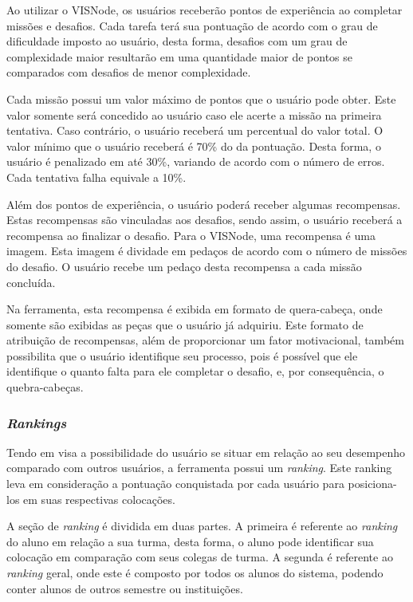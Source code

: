 \documentclass[
	12pt,				%
	oneside,			%
	a4paper,			%
	english,			%
	french,				%
	spanish,			%
	brazil,				%
	]{abntex2}
\begin{document}
Ao utilizar o VISNode, os usuários receberão pontos de experiência ao completar missões e desafios. Cada tarefa terá sua pontuação de acordo com o grau de dificuldade imposto ao usuário, desta forma, desafios com um grau de complexidade maior resultarão em uma quantidade maior de pontos se comparados com desafios de menor complexidade.

Cada missão possui um valor máximo de pontos que o usuário pode obter. Este valor somente será concedido ao usuário caso ele acerte a missão na primeira tentativa. Caso contrário, o usuário receberá um percentual do valor total. O valor mínimo que o usuário receberá é 70\% do da pontuação. Desta forma, o usuário é penalizado em até 30\%, variando de acordo com o número de erros. Cada tentativa falha equivale a 10\%.

Além dos pontos de experiência, o usuário poderá receber algumas recompensas. Estas recompensas são vinculadas aos desafios, sendo assim, o usuário receberá a recompensa ao finalizar o desafio. Para o VISNode, uma recompensa é uma imagem. Esta imagem é dividade em pedaços de acordo com o número de missões do desafio. O usuário recebe um pedaço desta recompensa a cada missão concluída.

Na ferramenta, esta recompensa é exibida em formato de quera-cabeça, onde somente são exibidas as peças que o usuário já adquiriu. Este formato de atribuição de recompensas, além de proporcionar um fator motivacional, também possibilita que o usuário identifique seu processo, pois é possível que ele identifique o quanto falta para ele completar o desafio, e, por consequência, o quebra-cabeças. 

\subsubsection{\textit{Rankings}}

Tendo em visa a possibilidade do usuário se situar em relação ao seu desempenho comparado com outros usuários, a ferramenta possui um \textit{ranking}. Este ranking leva em consideração a pontuação conquistada por cada usuário para posiciona-los em suas respectivas colocações.

A seção de \textit{ranking} é dividida em duas partes. A primeira é referente ao \textit{ranking} do aluno em relação a sua turma, desta forma, o aluno pode identificar sua colocação em comparação com seus colegas de turma. A segunda é referente ao \textit{ranking} geral, onde este é composto por todos os alunos do sistema, podendo conter alunos de outros semestre ou instituições.
\end{document}
